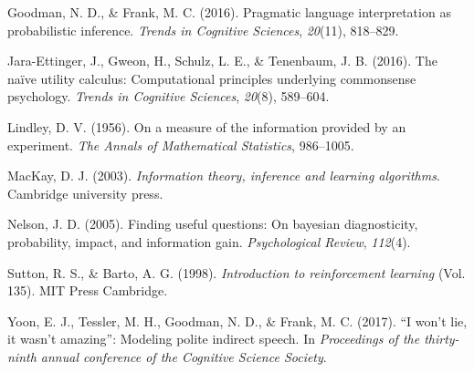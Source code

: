 \documentclass[10pt, letterpaper]{article}
\begin{document}
\hypertarget{ref-goodman2016}{}
Goodman, N. D., \& Frank, M. C. (2016). Pragmatic language
interpretation as probabilistic inference. \emph{Trends in Cognitive
Sciences}, \emph{20}(11), 818--829.

\hypertarget{ref-jara2016}{}
Jara-Ettinger, J., Gweon, H., Schulz, L. E., \& Tenenbaum, J. B. (2016).
The naïve utility calculus: Computational principles underlying
commonsense psychology. \emph{Trends in Cognitive Sciences},
\emph{20}(8), 589--604.

\hypertarget{ref-lindley1956}{}
Lindley, D. V. (1956). On a measure of the information provided by an
experiment. \emph{The Annals of Mathematical Statistics}, 986--1005.

\hypertarget{ref-mackay2003}{}
MacKay, D. J. (2003). \emph{Information theory, inference and learning
algorithms}. Cambridge university press.

\hypertarget{ref-nelson2005}{}
Nelson, J. D. (2005). Finding useful questions: On bayesian
diagnosticity, probability, impact, and information gain.
\emph{Psychological Review}, \emph{112}(4).

\hypertarget{ref-sutton1998}{}
Sutton, R. S., \& Barto, A. G. (1998). \emph{Introduction to
reinforcement learning} (Vol. 135). MIT Press Cambridge.

\hypertarget{ref-yoon2017}{}
Yoon, E. J., Tessler, M. H., Goodman, N. D., \& Frank, M. C. (2017). ``I
won't lie, it wasn't amazing'': Modeling polite indirect speech. In
\emph{Proceedings of the thirty-ninth annual conference of the Cognitive
Science Society}.
\end{document}
